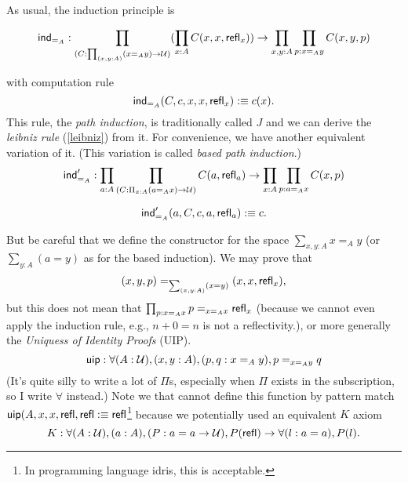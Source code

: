 As usual, the induction principle is

\begin{equation}
    \label{ind_id}
    \text{\sf ind}_{=_A}:\prod_{(C:\prod_{(x,y:A)}(x=_A y)\to\mathcal{U})}
    (\prod_{x:A}C(x,x,\text{\sf refl}_x))\to\prod_{x,y:A}\prod_{p:x=_A y}C(x,y,p)
\end{equation}

with computation rule
$$
    \text{\sf ind}_{=_A}(C,c,x,x,\text{\sf refl}_x):\equiv c(x).
$$
This rule, the {\it path induction}, is traditionally called $J$ and we 
can derive the {\it leibniz rule} (\autoref{leibniz}) from it. For 
convenience, we have another equivalent variation of it. (This variation 
is called {\it based path induction}.)
$$
    \text{\sf ind}'_{=_A}:\prod_{a:A}\prod_{(C:\Pi_{x:A}(a=_A x)\to \mathcal{U})}
    C(a, \text{\sf refl}_a) \to \prod_{x:A}\prod_{p:a=_A x}C(x, p)
$$

$$
    \text{\sf ind}'_{=_A}(a, C, c, a,\text{\sf refl}_a) :\equiv c.
$$

But be careful that we define the constructor for the space 
$\sum_{x,y:A}x=_A y$ (or $\sum_{y:A}(a=y)$ as for the based induction).
We may prove that $$(x,y,p)=_{\sum_{(x,y:A)}(x=y)}(x,x,\text{\sf refl}_x),$$ but
this does not mean that $\prod_{p:x=_A x}p=_{x=_Ax}\text{\sf refl}_x$ (because
we cannot even apply the induction rule, e.g., $n+0=n$ is not a 
reflectivity.), or more generally the {\it
Uniquess of Identity Proofs} (UIP).
\newcommand{\uip}{\name{uip}}
\begin{equation}
    \label{uip}
    \uip: \forall (A: \universe), (x,y:A), (p,q:x=_A y),p=_{x=_A y}q
\end{equation}
(It's quite silly to write a lot of $\Pi$s, especially when $\Pi$ exists
in the subscription, so I write $\forall$ instead.)
Note we that cannot define this function by pattern match 
$\uip(A,x,x,\refl,\refl\defn\refl$\footnote{In programming language
idris, this is acceptable.} because we potentially used an
equivalent $K$ axiom \cite{pattern-matching-without-K}
\begin{equation}
    \label{K-axiom}
    K: \forall (A:\mathcal{U}), (a:A), (P: a=a\to\mathcal{U}),
    P(\text{\sf refl})\to\forall (l: a = a), P(l).
\end{equation}

